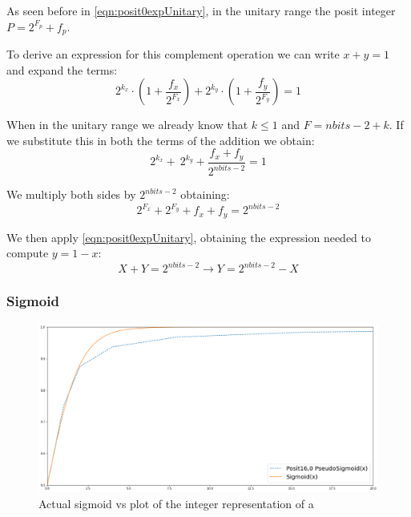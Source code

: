As seen before in \eqref{eqn:posit0expUnitary}, in the unitary range the posit integer $P = 2^{F_p} + f_p$. 

To derive an expression for this complement operation we can write $x + y = 1$ and expand the terms:
\begin{equation}
    2^{k_x} \cdot \left(1 + \frac{f_x}{2^{F_x}} \right) + 2^{k_y} \cdot \left(1 + \frac{f_y}{2^{F_y}} \right) = 1
\end{equation}

When in the unitary range we already know that $k \leq 1$ and $F = nbits - 2 + k$. If we substitute this in both the terms of the addition we obtain:
\begin{equation}
    2^{k_x} + \ 2^{k_y} + \frac{f_x + f_y}{2^{nbits - 2}} = 1
\end{equation}

We multiply both sides by $2^{nbits - 2}$ obtaining:
\begin{equation}
    2^{F_x} + 2^{F_y} + f_x + f_y = 2^{nbits - 2}
\end{equation}

We then apply  \eqref{eqn:posit0expUnitary}, obtaining the expression needed to compute $y = 1 - x$:
\begin{equation}
    X + Y = 2^{nbits - 2} \xrightarrow{} Y = 2^{nbits - 2} - X
\end{equation}



\subsubsection{Sigmoid}
\begin{figure}
    \centering
    \includegraphics[width=\linewidth]{img/sigmoidPosit160.png}
    \caption{Actual sigmoid vs plot of the integer representation of a }
    \label{fig:posit160Sigmoid}
\end{figure}

